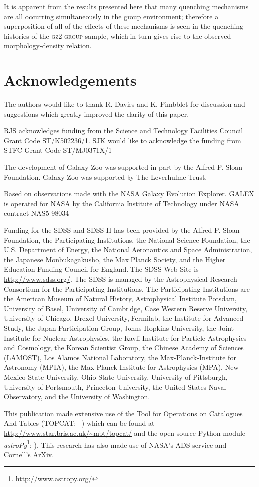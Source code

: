 \documentclass[useAMS,usenatbib]{mn2e}
\begin{document}
It is apparent from the results presented here that many quenching mechanisms are all occurring simultaneously in the group environment; therefore a superposition of all of the effects of these mechanisms is seen in the quenching histories of the \textsc{gz2-group} sample, which in turn gives rise to the observed morphology-density relation. 

\section*{Acknowledgements}
The authors would like to thank R. Davies and K. Pimbblet for discussion and suggestions which greatly improved the clarity of this paper. 

RJS acknowledges funding from the Science and Technology Facilities Council Grant Code ST/K502236/1. SJK would like to acknowledge the funding from STFC Grant Code ST/MJ0371X/1

The development of Galaxy Zoo was supported in part by the Alfred P. Sloan Foundation. Galaxy Zoo was supported by The Leverhulme Trust. 

Based on observations made with the NASA Galaxy Evolution Explorer.  GALEX is operated for NASA by the California Institute of Technology under NASA contract NAS5-98034

Funding for the SDSS and SDSS-II has been provided by the Alfred P. Sloan Foundation, the Participating Institutions, the National Science Foundation, the U.S. Department of Energy, the National Aeronautics and Space Administration, the Japanese Monbukagakusho, the Max Planck Society, and the Higher Education Funding Council for England. The SDSS Web Site is \url{http://www.sdss.org/}.
The SDSS is managed by the Astrophysical Research Consortium for the Participating Institutions. The Participating Institutions are the American Museum of Natural History, Astrophysical Institute Potsdam, University of Basel, University of Cambridge, Case Western Reserve University, University of Chicago, Drexel University, Fermilab, the Institute for Advanced Study, the Japan Participation Group, Johns Hopkins University, the Joint Institute for Nuclear Astrophysics, the Kavli Institute for Particle Astrophysics and Cosmology, the Korean Scientist Group, the Chinese Academy of Sciences (LAMOST), Los Alamos National Laboratory, the Max-Planck-Institute for Astronomy (MPIA), the Max-Planck-Institute for Astrophysics (MPA), New Mexico State University, Ohio State University, University of Pittsburgh, University of Portsmouth, Princeton University, the United States Naval Observatory, and the University of Washington.

This publication made extensive use of the Tool for Operations on Catalogues And Tables (TOPCAT; ~\citealt{taylor05}) which can be found at \url{http://www.star.bris.ac.uk/~mbt/topcat/} and the open source Python module \emph{astroPy}\footnote{\url{http://www.astropy.org/}}; \citealt{astropy13}). This research has also made use of NASA's ADS service and Cornell's ArXiv. 



  
\end{document}
